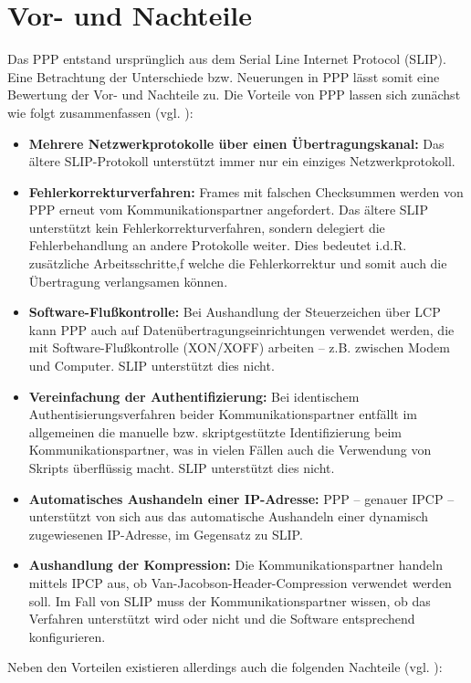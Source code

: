 \documentclass[journal,11pt]{IEEEtran}
\begin{document}
\section{Vor- und Nachteile} 
%
Das PPP entstand ursprünglich aus dem Serial Line Internet Protocol (SLIP).
Eine Betrachtung der Unterschiede bzw. Neuerungen in PPP lässt somit eine
Bewertung der Vor- und Nachteile zu. Die Vorteile
von PPP lassen sich zunächst wie folgt zusammenfassen (vgl. \cite{ppp_slip_uniwi}):
%
\begin{itemize}
\item \textbf{Mehrere Netzwerkprotokolle über einen Übertragungskanal:} Das ältere SLIP-Protokoll unterstützt immer nur ein einziges Netzwerkprotokoll.
\item \textbf{Fehlerkorrekturverfahren:} Frames mit falschen Checksummen werden von PPP erneut vom Kommunikationspartner angefordert. Das ältere
	SLIP unterstützt kein Fehlerkorrekturverfahren, sondern delegiert die Fehlerbehandlung an andere Protokolle weiter. Dies bedeutet i.d.R. zusätzliche
	Arbeitsschritte,f welche die Fehlerkorrektur und somit auch die Übertragung verlangsamen können.
\item \textbf{Software-Flußkontrolle:} Bei Aushandlung der Steuerzeichen über LCP kann PPP auch auf Datenübertragungseinrichtungen verwendet werden, die mit Software-Flußkontrolle (XON/XOFF) arbeiten -- z.B. zwischen Modem und Computer. SLIP unterstützt dies nicht.
\item \textbf{Vereinfachung der Authentifizierung:} Bei identischem Authentisierungsverfahren beider Kommunikationspartner entfällt im allgemeinen die manuelle bzw. skriptgestützte Identifizierung beim Kommunikationspartner, was in vielen Fällen auch die Verwendung von Skripts überflüssig macht. SLIP unterstützt dies nicht.
\item \textbf{Automatisches Aushandeln einer IP-Adresse:} PPP -- genauer IPCP -- unterstützt von sich aus das automatische Aushandeln einer dynamisch zugewiesenen IP-Adresse, im Gegensatz zu SLIP.
\item \textbf{Aushandlung der Kompression:} Die Kommunikationspartner handeln mittels IPCP aus, ob Van-Jacobson-Header-Compression verwendet werden soll. Im Fall von SLIP muss der Kommunikationspartner wissen, ob das Verfahren unterstützt wird oder nicht und die Software entsprechend konfigurieren.
\end{itemize}
%
Neben den Vorteilen existieren allerdings auch die folgenden Nachteile (vgl. \cite{ppp_slip_uniwi}):
%
\end{document}
